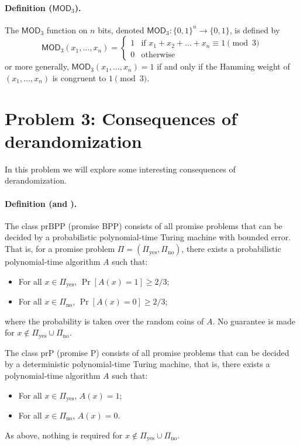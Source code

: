 \documentclass[12pt]{article}
\begin{document}
\paragraph{Definition ($\mathsf{MOD}_3$).}
The $\mathsf{MOD}_3$ function on $n$ bits, denoted $\mathsf{MOD}_3:\{0,1\}^n \to \{0,1\}$, is defined by
\[
    \mathsf{MOD}_3(x_1, \dots, x_n) = 
    \begin{cases}
        1 &\text{if } x_1 + x_2 + \dots + x_n \equiv 1 \pmod{3} \\
        0 &\text{otherwise}
    \end{cases}
\]
or more generally, $\mathsf{MOD}_3(x_1, \dots, x_n) = 1$ if and only if the Hamming weight of $(x_1, \dots, x_n)$ is congruent to $1 \pmod{3}$.

\newpage

\section{Problem 3: Consequences of derandomization}

In this problem we will explore some interesting consequences of derandomization.

\newcommand{\prBPP}{}
\newcommand{\prP}{}


\paragraph{Definition (\prBPP and \prP).}
The class $\prBPP$ (promise BPP) consists of all promise problems that can be decided by a probabilistic polynomial-time Turing machine with bounded error. That is, for a promise problem $\Pi = (\Pi_\text{yes}, \Pi_\text{no})$, there exists a probabilistic polynomial-time algorithm $A$ such that:
\begin{itemize}
    \item For all $x \in \Pi_\text{yes}$, $\Pr[A(x) = 1] \geq 2/3$;
    \item For all $x \in \Pi_\text{no}$, $\Pr[A(x) = 0] \geq 2/3$;
\end{itemize}
where the probability is taken over the random coins of $A$. No guarantee is made for $x \notin \Pi_\text{yes} \cup \Pi_\text{no}$.

The class $\prP$ (promise P) consists of all promise problems that can be decided by a deterministic polynomial-time Turing machine, that is, there exists a polynomial-time algorithm $A$ such that:
\begin{itemize}
    \item For all $x \in \Pi_\text{yes}$, $A(x) = 1$;
    \item For all $x \in \Pi_\text{no}$, $A(x) = 0$.
\end{itemize}
As above, nothing is required for $x \notin \Pi_\text{yes} \cup \Pi_\text{no}$.
\end{document}
